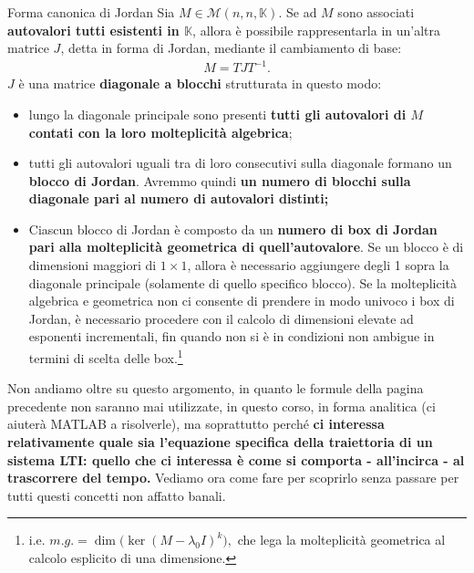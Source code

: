 \documentclass[a4paper]{report}
\begin{document}
\begin{defin}{Forma canonica di Jordan}{}
Sia $M \in \mathcal{M}(n,n,\mathbb{K}).$ Se ad $M$ sono associati \textbf{autovalori tutti esistenti in $\mathbb{K}$}, allora è possibile rappresentarla in un'altra matrice $J$, detta in forma di Jordan, mediante il cambiamento di base:
\begin{align*}
	M = TJT^{-1}.
\end{align*}
$J$ è una matrice \textbf{diagonale a blocchi} strutturata in questo modo:
	\begin{itemize}
		\item lungo la diagonale principale sono presenti \textbf{tutti gli autovalori di $M$ contati con la loro molteplicità algebrica};
		\item tutti gli autovalori uguali tra di loro consecutivi sulla diagonale formano un \textbf{blocco di Jordan}. Avremmo quindi \textbf{un numero di blocchi sulla diagonale pari al numero di autovalori distinti;}
		\item Ciascun blocco di Jordan è composto da un \textbf{numero di box di Jordan pari alla molteplicità geometrica di quell'autovalore}. Se un blocco è di dimensioni maggiori di $1\times 1$, allora è necessario aggiungere degli 1 sopra la diagonale principale (solamente di quello specifico blocco). Se la molteplicità algebrica e geometrica non ci consente di prendere in modo univoco i box di Jordan, è necessario procedere con il calcolo di dimensioni elevate ad esponenti incrementali, fin quando non si è in condizioni non ambigue in termini di scelta delle box.\footnote{i.e. $m.g. = \dim({\ker{(M-\lambda_0 I)^k})},$ che lega la molteplicità geometrica al calcolo esplicito di una dimensione.}
	\end{itemize}
\end{defin}
Non andiamo oltre su questo argomento, in quanto le formule della pagina precedente non saranno mai utilizzate, in questo corso, in forma analitica (ci aiuterà MATLAB a risolverle), ma soprattutto perché \textbf{ci interessa relativamente quale sia l'equazione specifica della traiettoria di un sistema LTI: quello che ci interessa è come si comporta - all'incirca - al trascorrere del tempo.} Vediamo ora come fare per scoprirlo senza passare per tutti questi concetti non affatto banali.
\end{document}

